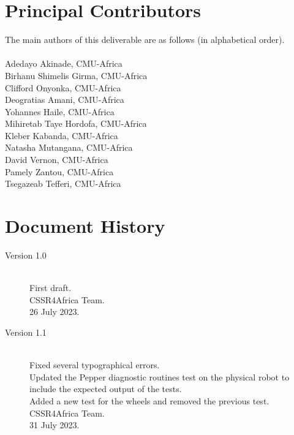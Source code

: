 \documentclass{CSSRforAfrica}
\newcommand{\blank}{~\\}
\begin{document}
{\section*{Principal Contributors}
\label{contributors}
The main authors of this deliverable are as follows (in alphabetical order).
\blank
~
\blank
Adedayo Akinade, CMU-Africa\\          %
Birhanu Shimelis Girma, CMU-Africa\\
Clifford Onyonka, CMU-Africa\\
Deogratias Amani, CMU-Africa\\  
Yohannes Haile, CMU-Africa\\ 
Mihiretab Taye Hordofa, CMU-Africa\\ 
Kleber Kabanda, CMU-Africa\\
Natasha Mutangana, CMU-Africa\\ 
David Vernon, CMU-Africa\\
Pamely Zantou, CMU-Africa\\
Tsegazeab Tefferi, CMU-Africa\\

\pagebreak
\section*{Document History}
\label{document_history}

\begin{description}

\item [Version 1.0]~\\
First draft. \\
CSSR4Africa Team. \\ %
26 July 2023. %

\item [Version 1.1]~\\
Fixed several typographical errors.\\
Updated the Pepper diagnostic routines test on the physical robot to include the expected output of the tests.\\
Added a new test for the wheels and removed the previous test.\\
CSSR4Africa Team.\\
31 July 2023.


\end{description}}
\end{document}
